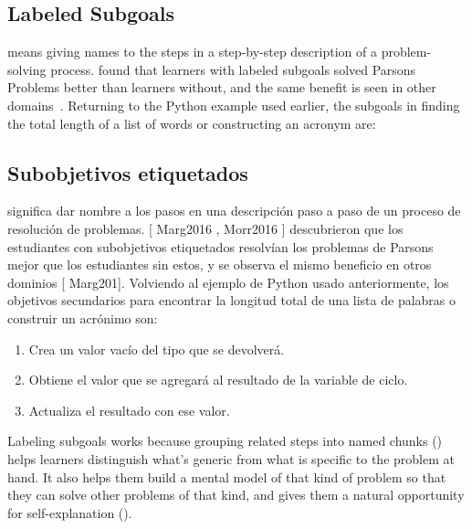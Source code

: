 {\subsection*{Labeled Subgoals}

 means
giving names to the steps in a step-by-step description of a problem-solving process.
\cite{Marg2016,Morr2016} found that learners with labeled subgoals
solved Parsons Problems better than learners without,
and the same benefit is seen in other domains~\cite{Marg2012}.
Returning to the Python example used earlier,
the subgoals in finding the total length of a list of words or constructing an acronym are:

\subsection*{Subobjetivos etiquetados}
 
  significa 
dar nombre a los pasos en una descripción paso a paso de un proceso de resolución de problemas. 
[ Marg2016 , Morr2016 ] descubrieron que los estudiantes con subobjetivos etiquetados 
resolvían los problemas de Parsons mejor que los estudiantes sin estos, 
y se observa el mismo beneficio en otros dominios [ Marg201]. 
Volviendo al ejemplo de Python usado anteriormente, 
los objetivos secundarios para encontrar la longitud total de una lista de palabras o construir un acrónimo son:

\begin{enumerate}

\item
  Crea un valor vacío del tipo que se devolverá.

\item
  Obtiene el valor que se agregará al resultado de la variable de ciclo.

\item
  Actualiza el resultado con ese valor.

\end{enumerate}

Labeling subgoals works because grouping related steps into named chunks ()
helps learners distinguish what's generic from what is specific to the problem at hand.
It also helps them build a mental model of that kind of problem
so that they can solve other problems of that kind,
and gives them a natural opportunity for self-explanation ().

}
